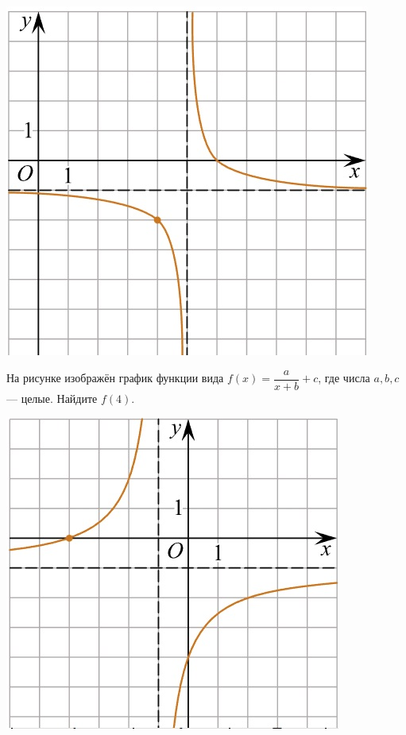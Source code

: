 \begin{class}[number=5]
\begin{listofex}
\begin{minipage}[c]{0.25\textwidth}
			\includegraphics[align=t, width=\textwidth]{pics/G101M4C5-2.jpg}
		\end{minipage}
		\item
		\begin{minipage}[t]{0.43\textwidth}
			На рисунке изображён график функции вида \(f(x)=\dfrac{a}{x+b}+c\), где числа \(a, b, c\) --- целые. Найдите \(f(4)\).
		\end{minipage}
		\begin{minipage}[c]{0.25\textwidth}
			\includegraphics[align=t, width=\textwidth]{pics/G101M4C5-3.jpg}

\end{minipage}
\end{listofex}
\end{class}
